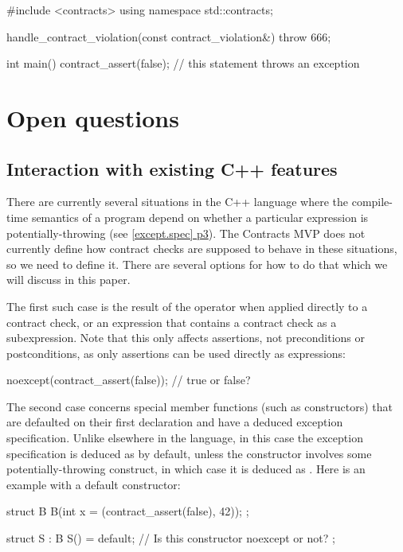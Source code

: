 \begin{codeblock}
#include <contracts>
using namespace std::contracts;

handle_contract_violation(const contract_violation&) {
  throw 666;
}

int main() {
  contract_assert(false);  // this statement throws an exception
}
\end{codeblock}

\section{Open questions}
\subsection{Interaction with existing C++ features}

There are currently several situations in the C++ language where the compile-time semantics of a program depend on whether a particular expression is potentially-throwing (see \href{https://eel.is/c++draft/except.spec#3}{[except.spec] p3}). The Contracts MVP does not currently define how contract checks are supposed to behave in these situations, so we need to define it. There are several options for how to do that which we will discuss in this paper.


The first such case is the result of the  operator when applied directly to a contract check, or an expression that contains a contract check as a subexpression. Note that this only affects assertions, not preconditions or postconditions, as only assertions can be used directly as expressions:

\begin{codeblock}
noexcept(contract_assert(false));   // true or false?
\end{codeblock}

The second case concerns special member functions (such as constructors) that are defaulted on their first declaration and have a deduced exception specification. Unlike elsewhere in the language, in this case the exception specification is deduced as  by default, unless the constructor involves some potentially-throwing construct, in which case it is deduced as . Here is an example with a default constructor:

\begin{codeblock}
struct B {
  B(int x = (contract_assert(false), 42));
};

struct S : B {
  S() = default;  // Is this constructor noexcept or not?
};
\end{codeblock}

